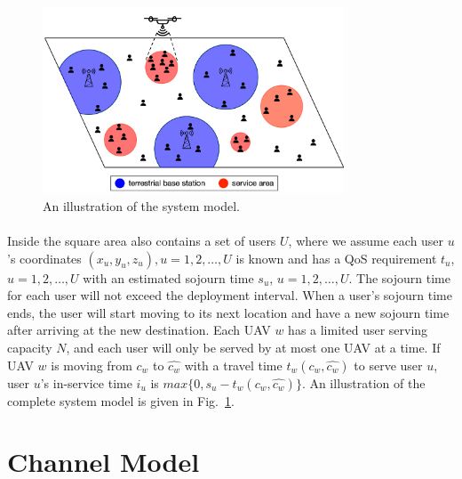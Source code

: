 \documentclass[a4paper,12pt]{report}
\begin{document}
\begin{figure}
    \centering
    \includegraphics[width=0.8\textwidth]{Figure 1.png}
    \caption{An illustration of the system model.}
    \label{fig:System Model Example}
\end{figure}

\paragraph{}
Inside the square area also contains a set of users $U$, where we assume each user $u$'s coordinates $(x_{u},y_{u},z_{u}), u = 1, 2, \ldots, U$ is known and has a QoS requirement $t_{u}$, $u = 1, 2, \ldots, U$ with an estimated sojourn time $s_{u}$, $u = 1, 2, \ldots, U$. The sojourn time for each user will not exceed the deployment interval. When a user's sojourn time ends, the user will start moving to its next location and have a new sojourn time after arriving at the new destination. Each UAV $w$ has a limited user serving capacity $N$, and each user will only be served by at most one UAV at a time. If UAV $w$ is moving from $c_{w}$ to $\hat{c_{w}}$ with a travel time $t_{w}(c_{w}, \hat{c_{w}})$ to serve user $u$, user $u$'s in-service time $i_{u}$ is $max\{0, s_{u} - t_{w}(c_{w}, \hat{c_{w}})\}$. An illustration of the complete system model is given in Fig.~\ref{fig:System Model Example}.

\section{Channel Model}
\end{document}

